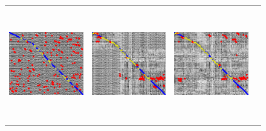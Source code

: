 \documentclass[twocolumn]{article}
\begin{document}
\newcommand{\imgH}{5cm}
\newcommand{\imgW}{4cm}
\begin{figure}[!htbp]
 \begin{tabular*}{\textwidth}{cccc}
  \includegraphics[width=\imgW,height=\imgH]{campus-io-without-bad-101} &
  \includegraphics[width=\imgW,height=\imgH]{campus-io-with-bad-71} &
  \includegraphics[width=\imgW,height=\imgH]{campus-io-without-good-105} &

\end{tabular*}
\end{figure}
\end{document}

